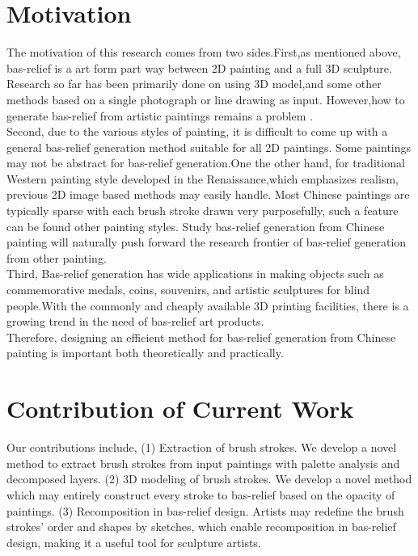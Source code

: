 \section{Motivation}
The motivation of this research comes from two sides.First,as mentioned above, bas-relief is a art form part way between 2D painting and a full 3D sculpture\cite{benzaid2017analysis}\cite{weyrich2007digital}\cite{kerber2009feature}\cite{kerber2012computer}\cite{zeng2014region}. Research so far has been primarily done on using 3D model,and some other methods based on a single photograph or line drawing as input. However,how to generate bas-relief from artistic paintings remains a problem .\\
Second, due to the various styles of painting, it is difficult to come up with a general bas-relief generation method suitable for all 2D paintings. Some paintings may not be abstract for bas-relief generation.One the other hand, for traditional Western painting style developed in the Renaissance,which emphasizes realism\cite{chu2004real}, previous 2D image based methods may easily handle. Most Chinese paintings are typically sparse with each brush stroke drawn very purposefully\cite{smith1997art}, such a feature can be found other painting styles. Study bas-relief generation from Chinese painting will naturally push forward the research frontier of bas-relief generation from other painting. \\
Third, Bas-relief generation has wide applications in making objects such as commemorative medals, coins, souvenirs, and artistic sculptures for blind people.With the commonly and cheaply available 3D printing facilities, there is a growing trend in the need of bas-relief art products.\\

Therefore, designing an efficient method for bas-relief generation from Chinese painting is important both theoretically and practically.


\section{Contribution of Current Work}
Our contributions include,
\newline
(1) Extraction of brush strokes. We develop a novel method to extract brush strokes from input paintings with palette analysis and decomposed layers.
\newline
(2) 3D modeling of brush strokes. We develop a novel method which may entirely construct every stroke to bas-relief based on the opacity of paintings.
\newline
(3) Recomposition in bas-relief design. Artists may redefine the brush strokes’ order and shapes by sketches, which enable recomposition in bas-relief design, making it a useful tool for sculpture artists.


